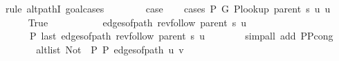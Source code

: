 \begin{isabellebody}
%
\isadelimproof
%
\endisadelimproof
%
\isatagproof
{}\isamarkupfalse%
\ {\isacharparenleft}{\kern0pt}rule\ alt{\isacharunderscore}{\kern0pt}pathI{\isacharcomma}{\kern0pt}\ goal{\isacharunderscore}{\kern0pt}cases{\isacharparenright}{\kern0pt}\isanewline
\ \ \isamarkupfalse%
\ {}\isanewline
\ \ \isamarkupfalse%
\ {\isacharquery}{\kern0pt}case\isanewline
\ \ \isamarkupfalse%
\ {\isacharparenleft}{\kern0pt}cases\ {\isachardoublequoteopen}P{\isacharprime}{\kern0pt}\ G{}\ {\isacharparenleft}{\kern0pt}P{\isacharunderscore}{\kern0pt}lookup\ {\isacharparenleft}{\kern0pt}parent\ s{\isacharparenright}{\kern0pt}\ u{\isacharparenright}{\kern0pt}\ u{\isachardoublequoteclose}{\isacharparenright}{\kern0pt}\isanewline
\ \ \ \ \isamarkupfalse%
\ True\isanewline
\ \ \ \ \isamarkupfalse%
\isanewline
\ \ \ \ \ \ {\isachardoublequoteopen}edges{\isacharunderscore}{\kern0pt}of{\isacharunderscore}{\kern0pt}path\ {\isacharparenleft}{\kern0pt}rev{\isacharunderscore}{\kern0pt}follow\ {\isacharparenleft}{\kern0pt}parent\ s{\isacharparenright}{\kern0pt}\ u{\isacharparenright}{\kern0pt}\ {\isasymnoteq}\ {\isacharbrackleft}{\kern0pt}{\isacharbrackright}{\kern0pt}{\isachardoublequoteclose}\isanewline
\ \ \ \ \ \ {\isachardoublequoteopen}P{\isacharprime}{\kern0pt}{\isacharprime}{\kern0pt}\ {\isacharparenleft}{\kern0pt}last\ {\isacharparenleft}{\kern0pt}edges{\isacharunderscore}{\kern0pt}of{\isacharunderscore}{\kern0pt}path\ {\isacharparenleft}{\kern0pt}rev{\isacharunderscore}{\kern0pt}follow\ {\isacharparenleft}{\kern0pt}parent\ s{\isacharparenright}{\kern0pt}\ u{\isacharparenright}{\kern0pt}{\isacharparenright}{\kern0pt}{\isacharparenright}{\kern0pt}{\isachardoublequoteclose}\isanewline
\ \ \ \ \ \ \isamarkupfalse%
\ {\isacharparenleft}{\kern0pt}simp{\isacharunderscore}{\kern0pt}all\ add{\isacharcolon}{\kern0pt}\ P{\isacharprime}{\kern0pt}{\isacharunderscore}{\kern0pt}P{\isacharprime}{\kern0pt}{\isacharprime}{\kern0pt}{\isacharunderscore}{\kern0pt}cong{\isacharparenright}{\kern0pt}\isanewline
\ \ \ \ \isamarkupfalse%
\ \isamarkupfalse%
\ {\isachardoublequoteopen}alt{\isacharunderscore}{\kern0pt}list\ {\isacharparenleft}{\kern0pt}Not\ {\isasymcirc}\ P{\isacharprime}{\kern0pt}{\isacharprime}{\kern0pt}{\isacharparenright}{\kern0pt}\ P{\isacharprime}{\kern0pt}{\isacharprime}{\kern0pt}\ {\isacharparenleft}{\kern0pt}edges{\isacharunderscore}{\kern0pt}of{\isacharunderscore}{\kern0pt}path\ {\isacharbrackleft}{\kern0pt}u{\isacharcomma}{\kern0pt}\ v{\isacharbrackright}{\kern0pt}{\isacharparenright}{\kern0pt}{\isachardoublequoteclose}\isanewline

\end{isabellebody}
